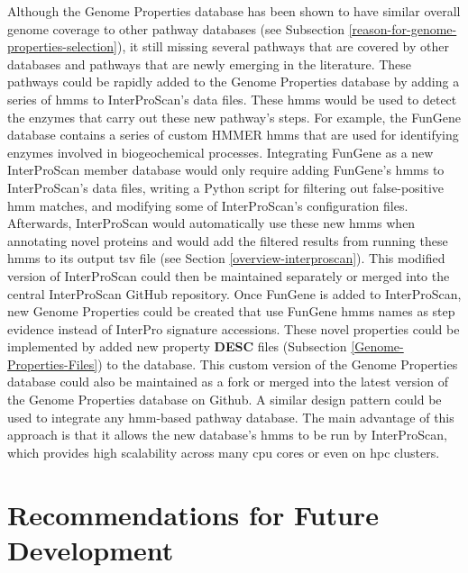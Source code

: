 Although the Genome Properties database has been shown to have similar overall 
genome coverage to other pathway databases (see Subsection 
\ref{reason-for-genome-properties-selection}), it still missing several pathways 
that are covered by other databases and pathways that are newly emerging in the 
literature. These pathways could be rapidly added to the Genome Properties 
database by adding a series of \gls{hmm}s \cite{eddy2011accelerated} to 
InterProScan's data files. These \gls{hmm}s would be used to detect the enzymes 
that carry out these new pathway's steps. For example, the FunGene 
\cite{fish2013fungene} database contains a series of custom HMMER 
\cite{eddy2011accelerated} \gls{hmm}s that are used for identifying enzymes 
involved in biogeochemical processes. Integrating FunGene as a new InterProScan 
member database would only require adding FunGene's \gls{hmm}s to InterProScan's 
data files, writing a Python script for filtering out false-positive \gls{hmm} 
matches, and modifying some of InterProScan's configuration files. Afterwards, 
InterProScan would automatically use these new \gls{hmm}s when annotating novel 
proteins and would add the filtered results from running these \gls{hmm}s to its 
output \gls{tsv} file (see Section \ref{overview-interproscan}). This modified 
version of InterProScan could then be maintained separately or merged into the 
central InterProScan GitHub repository. Once FunGene is added to InterProScan, 
new Genome Properties could be created that use FunGene \gls{hmm}s names as step 
evidence instead of InterPro signature accessions. These novel properties could 
be implemented by added new property \textbf{DESC} files (Subsection 
\ref{Genome-Properties-Files}) to the database. This custom version of the 
Genome Properties database could also be maintained as a fork or merged into the 
latest version of the Genome Properties database on Github. A similar design 
pattern could be used to integrate any \gls{hmm}-based pathway database. The 
main advantage of this approach is that it allows the new database's \gls{hmm}s 
to be run by InterProScan, which provides high scalability across many \gls{cpu} 
cores or even on \gls{hpc} clusters.

\section{Recommendations for Future Development}


